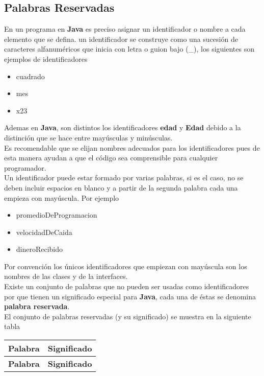 \documentclass[12pt, A4]{article}
\begin{document}
{{		\subsection{Palabras Reservadas}
		{
			En un programa en \textbf{Java} es preciso asignar un identificador o nombre a cada elemento que se defina. un identificador se construye como una sucesi\'on de caracteres alfanum\'ericos que inicia con letra o guion bajo (\_), los siguientes son ejemplos de identificadores  
			\begin{itemize}
				\item cuadrado
				\item mes
				\item x23
			\end{itemize}
			Ademas en \textbf{Java}, son distintos los identificadores \textbf{edad} y \textbf{Edad} debido a la distinci\'on que se hace entre may\'usculas y min\'usculas.\\
			Es recomendable que se elijan nombres adecuados para los identificadores pues de esta manera ayudan a que el c\'odigo sea comprensible para cualquier programador.\\
			Un identificador puede estar formado por varias palabras, si es el caso, no se deben incluir espacios en blanco y a partir de la segunda palabra cada una empieza con may\'uscula. Por ejemplo
			\begin{itemize}
				\item promedioDeProgramacion
				\item velocidadDeCaida
				\item dineroRecibido
			\end{itemize}
		Por convenci\'on los \'unicos identificadores que empiezan con may\'uscula son los nombres de las clases  y de la interfaces.\\Existe un  conjunto de palabras que no pueden ser usadas como identificadores por que tienen un significado especial para \textbf{Java}, cada una de \'estas se denomina \textbf{palabra reservada}.\\ El conjunto de palabras reservadas (y su significado) se muestra en la siguiente tabla   
		\begin{longtable}[h]{p{3cm} p{10cm}}
		\centering
		\hline
		
			\textbf{Palabra} & \textbf{Significado} \\
		\hline\hline
		\endfirsthead
		
		\hline
			\textbf{Palabra} & \textbf{Significado} \\
		\hline\hline
		\endhead
		

\end{longtable}}}}
\end{document}
